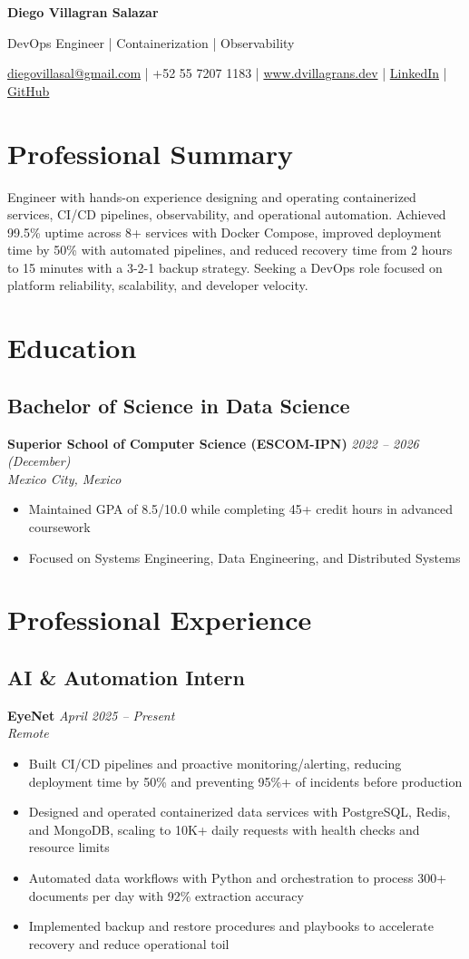 \documentclass[7.5pt,a4paper]{article}
\newcommand{\name}[1]{\begin{center}\Large\bfseries\color{HarvardCrimson}#1\end{center}}
\newcommand{\tagline}[1]{\begin{center}\normalsize\color{DarkGray}#1\end{center}}
\newcommand{\contactinfo}[1]{\begin{center}\small\color{MediumGray}#1\end{center}}
\newcommand{\experience}[4]{\subsection*{#1}\textbf{#2} \hfill \textit{#3} \\\textit{#4}}
\newcommand{\education}[4]{\subsection*{#1}\textbf{#2} \hfill \textit{#3} \\\textit{#4}}
\begin{document}
\name{Diego Villagran Salazar}
\tagline{DevOps Engineer | Containerization | Observability}
\contactinfo{\href{mailto:diegovillasal@gmail.com}{diegovillasal@gmail.com} | +52 55 7207 1183 | \href{https://www.dvillagrans.dev}{www.dvillagrans.dev} | \href{https://www.linkedin.com/in/dvillagrans}{LinkedIn} | \href{https://github.com/dvillagrans}{GitHub}}

\vspace{0.01cm}

\section*{Professional Summary}
\small
Engineer with hands-on experience designing and operating containerized services, CI/CD pipelines, observability, and operational automation. Achieved 99.5\% uptime across 8+ services with Docker Compose, improved deployment time by 50\% with automated pipelines, and reduced recovery time from 2 hours to 15 minutes with a 3-2-1 backup strategy. Seeking a DevOps role focused on platform reliability, scalability, and developer velocity.

\vspace{0.01cm}

\section*{Education}
\education{Bachelor of Science in Data Science}{Superior School of Computer Science (ESCOM-IPN)}{2022 -- 2026 (December)}{Mexico City, Mexico}
\begin{itemize}
\item Maintained GPA of 8.5/10.0 while completing 45+ credit hours in advanced coursework
\item Focused on Systems Engineering, Data Engineering, and Distributed Systems
\end{itemize}

\section*{Professional Experience}

\experience{AI \& Automation Intern}{EyeNet}{April 2025 -- Present}{Remote}
\begin{itemize}
\item Built CI/CD pipelines and proactive monitoring/alerting, reducing deployment time by 50\% and preventing 95\%+ of incidents before production
\item Designed and operated containerized data services with PostgreSQL, Redis, and MongoDB, scaling to 10K+ daily requests with health checks and resource limits
\item Automated data workflows with Python and orchestration to process 300+ documents per day with 92\% extraction accuracy
\item Implemented backup and restore procedures and playbooks to accelerate recovery and reduce operational toil
\end{itemize}
\end{document}
